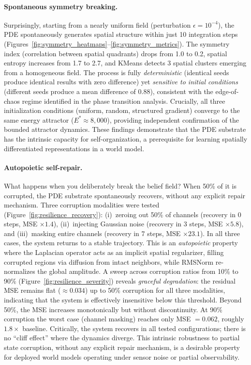 \documentclass{article}
\begin{document}
\paragraph{Spontaneous symmetry breaking.}
Surprisingly, starting from a nearly uniform field (perturbation $\epsilon = 10^{-4}$), the PDE spontaneously generates spatial structure within just 10 integration steps (Figures~\ref{fig:symmetry_heatmaps}--\ref{fig:symmetry_metrics}). The symmetry index (correlation between spatial quadrants) drops from 1.0 to 0.2, spatial entropy increases from 1.7 to 2.7, and KMeans detects 3 spatial clusters emerging from a homogeneous field. The process is fully \emph{deterministic} (identical seeds produce identical results with zero difference) yet \emph{sensitive to initial conditions} (different seeds produce a mean difference of 0.88), consistent with the edge-of-chaos regime identified in the phase transition analysis. Crucially, all three initialization conditions (uniform, random, structured gradient) converge to the same energy attractor ($E^* \approx 8{,}000$), providing independent confirmation of the bounded attractor dynamics. These findings demonstrate that the PDE substrate has the intrinsic capacity for self-organization, a prerequisite for learning spatially differentiated representations in a world model.

\paragraph{Autopoietic self-repair.}
What happens when you deliberately break the belief field? When 50\% of it is corrupted, the PDE substrate spontaneously recovers, without any explicit repair mechanism. Three corruption modalities were tested (Figure~\ref{fig:resilience_recovery}): (i)~zeroing out 50\% of channels (recovery in 0 steps, MSE $\times 1.4$), (ii)~injecting Gaussian noise (recovery in 3 steps, MSE $\times 5.8$), and (iii)~masking entire channels (recovery in 7 steps, MSE $\times 23.1$). In all three cases, the system returns to a stable trajectory. This is an \emph{autopoietic} property where the Laplacian operator acts as an implicit spatial regularizer, filling corrupted regions via diffusion from intact neighbors, while RMSNorm re-normalizes the global amplitude. A sweep across corruption ratios from 10\% to 90\% (Figure~\ref{fig:resilience_severity}) reveals \emph{graceful degradation}: the residual MSE remains flat ($\approx 0.034$) up to 50\% corruption for all three modalities, indicating that the system is effectively insensitive below this threshold. Beyond 50\%, the MSE increases monotonically but without discontinuity. At 90\% corruption the worst case (channel masking) reaches only MSE $= 0.062$, roughly $1.8\times$ baseline. Critically, the system recovers in all tested configurations; there is no ``cliff effect'' where the dynamics diverge. This intrinsic robustness to partial state corruption, without any explicit repair mechanism, is a desirable property for deployed world models operating under sensor noise or partial observability.
\end{document}
